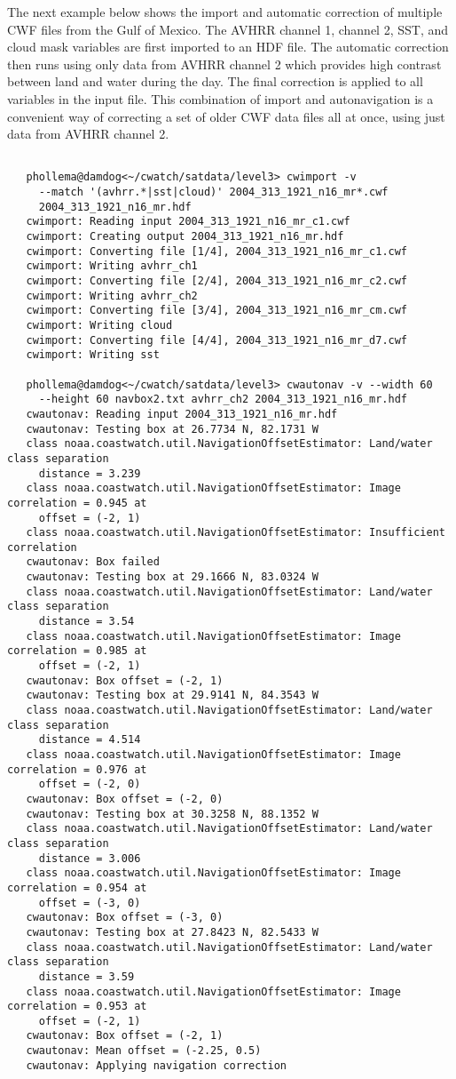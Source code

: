 The next example below shows the import and automatic correction of multiple CWF files from the Gulf of Mexico. The AVHRR channel 1, channel 2, SST, and cloud mask variables are first imported to an HDF file. The automatic correction then runs using only data from AVHRR channel 2 which provides high contrast between land and water during the day. The final correction is applied to all variables in the input file. This combination of import and autonavigation is a convenient way of correcting a set of older CWF data files all at once, using just data from AVHRR channel 2. \begin{verbatim}

   phollema@damdog<~/cwatch/satdata/level3> cwimport -v 
     --match '(avhrr.*|sst|cloud)' 2004_313_1921_n16_mr*.cwf 
     2004_313_1921_n16_mr.hdf
   cwimport: Reading input 2004_313_1921_n16_mr_c1.cwf
   cwimport: Creating output 2004_313_1921_n16_mr.hdf
   cwimport: Converting file [1/4], 2004_313_1921_n16_mr_c1.cwf
   cwimport: Writing avhrr_ch1
   cwimport: Converting file [2/4], 2004_313_1921_n16_mr_c2.cwf
   cwimport: Writing avhrr_ch2
   cwimport: Converting file [3/4], 2004_313_1921_n16_mr_cm.cwf
   cwimport: Writing cloud
   cwimport: Converting file [4/4], 2004_313_1921_n16_mr_d7.cwf
   cwimport: Writing sst

   phollema@damdog<~/cwatch/satdata/level3> cwautonav -v --width 60 
     --height 60 navbox2.txt avhrr_ch2 2004_313_1921_n16_mr.hdf
   cwautonav: Reading input 2004_313_1921_n16_mr.hdf
   cwautonav: Testing box at 26.7734 N, 82.1731 W
   class noaa.coastwatch.util.NavigationOffsetEstimator: Land/water class separation 
     distance = 3.239
   class noaa.coastwatch.util.NavigationOffsetEstimator: Image correlation = 0.945 at
     offset = (-2, 1)
   class noaa.coastwatch.util.NavigationOffsetEstimator: Insufficient correlation
   cwautonav: Box failed
   cwautonav: Testing box at 29.1666 N, 83.0324 W
   class noaa.coastwatch.util.NavigationOffsetEstimator: Land/water class separation 
     distance = 3.54
   class noaa.coastwatch.util.NavigationOffsetEstimator: Image correlation = 0.985 at 
     offset = (-2, 1)
   cwautonav: Box offset = (-2, 1)
   cwautonav: Testing box at 29.9141 N, 84.3543 W
   class noaa.coastwatch.util.NavigationOffsetEstimator: Land/water class separation 
     distance = 4.514
   class noaa.coastwatch.util.NavigationOffsetEstimator: Image correlation = 0.976 at 
     offset = (-2, 0)
   cwautonav: Box offset = (-2, 0)
   cwautonav: Testing box at 30.3258 N, 88.1352 W
   class noaa.coastwatch.util.NavigationOffsetEstimator: Land/water class separation 
     distance = 3.006
   class noaa.coastwatch.util.NavigationOffsetEstimator: Image correlation = 0.954 at 
     offset = (-3, 0)
   cwautonav: Box offset = (-3, 0)
   cwautonav: Testing box at 27.8423 N, 82.5433 W
   class noaa.coastwatch.util.NavigationOffsetEstimator: Land/water class separation 
     distance = 3.59
   class noaa.coastwatch.util.NavigationOffsetEstimator: Image correlation = 0.953 at 
     offset = (-2, 1)
   cwautonav: Box offset = (-2, 1)
   cwautonav: Mean offset = (-2.25, 0.5)
   cwautonav: Applying navigation correction
 
\end{verbatim}

